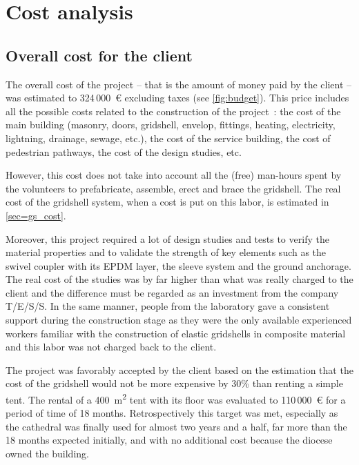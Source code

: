 \clearpage
\section{Cost analysis}\label{sec=costanalysis}
\subsection{Overall cost for the client}
The overall cost of the project -- that is the amount of money paid by the client -- was estimated to 324\,000~€ excluding taxes (see \cref{fig:budget}). This price includes all the possible costs related to the construction of the project~: the cost of the main building (masonry, doors, gridshell, envelop, fittings, heating, electricity, lightning, drainage, sewage, etc.), the cost of the service building, the cost of pedestrian pathways, the cost of the design studies, etc.

However, this cost does not take into account all the (free) man-hours spent by the volunteers to prefabricate, assemble, erect and brace the gridshell. The real cost of the gridshell system, when a cost is put on this labor, is estimated in \cref{sec=gs_cost}.

Moreover, this project required a lot of design studies and tests to verify the material properties and to validate the strength of key elements such as the swivel coupler with its EPDM layer, the sleeve system and the ground anchorage. The real cost of the studies was by far higher than what was really charged to the client and the difference must be regarded as an investment from the company T/E/S/S. In the same manner, people from the laboratory gave a consistent support during the construction stage as they were the only available experienced workers familiar with the construction of elastic gridshells in composite material \cite{Douthe2010a,Baverel2012} and this labor was not charged back to the client.

The project was favorably accepted by the client based on the estimation that the cost of the gridshell would not be more expensive by 30\% than renting a simple tent. The rental of a 400~m\textsuperscript{2} tent with its floor was evaluated to 110\,000~€ for a period of time of 18 months. Retrospectively this target was met, especially as the cathedral was finally used for almost two years and a half, far more than the 18 months expected initially, and with no additional cost because the diocese owned the building.

